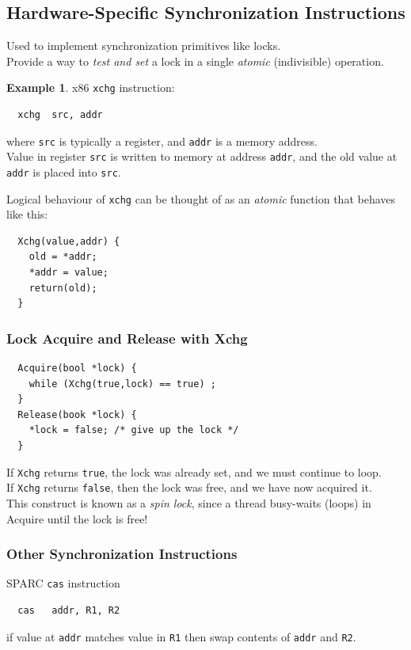\documentclass[12pt]{article}
\theoremstyle{plain}
\theoremstyle{definition}
\newtheorem*{ex*}{Example}
\begin{document}
\subsection{Hardware-Specific Synchronization Instructions}
Used to implement synchronization primitives like locks. \\
Provide a way to \emph{test and set} a lock in a single \emph{atomic} (indivisible) operation.
\begin{ex*}
x86 \texttt{xchg} instruction:
\begin{verbatim}
  xchg  src, addr
\end{verbatim}
where \texttt{src} is typically a register, and \texttt{addr} is a memory address. \\
Value in register \texttt{src} is written to memory at address \texttt{addr}, and the old value at \texttt{addr} is placed into \texttt{src}.
\end{ex*}
Logical behaviour of \texttt{xchg} can be thought of as an \emph{atomic} function that behaves like this:
\begin{verbatim}
  Xchg(value,addr) {
    old = *addr;
    *addr = value;
    return(old);
  }
\end{verbatim}

\subsubsection{Lock Acquire and Release with Xchg}
\begin{verbatim}
  Acquire(bool *lock) {
    while (Xchg(true,lock) == true) ;
  }
  Release(book *lock) {
    *lock = false; /* give up the lock */
  }
\end{verbatim}
If \texttt{Xchg} returns \texttt{true}, the lock was already set, and we must continue to loop. \\
If \texttt{Xchg} returns \texttt{false}, then the lock was free, and we have now acquired it. \\

This construct is known as a \emph{spin lock}, since a thread busy-waits (loops) in Acquire until the lock is free!

\subsubsection{Other Synchronization Instructions}
SPARC \texttt{cas} instruction
\begin{verbatim}
  cas   addr, R1, R2
\end{verbatim}
if value at \texttt{addr} matches value in \texttt{R1} then swap contents of \texttt{addr} and \texttt{R2}. \\
\end{document}
